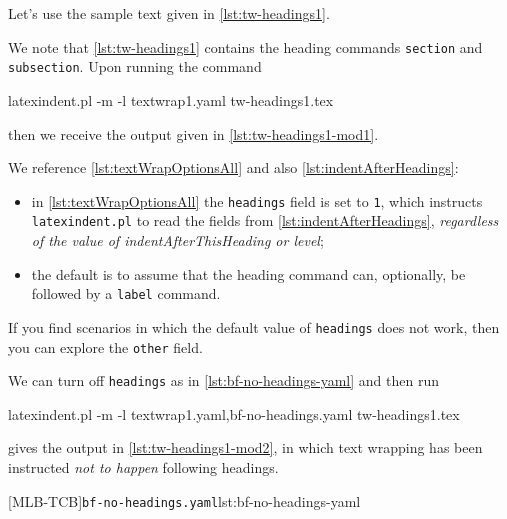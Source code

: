 \documentclass[10pt]{article}
\begin{document}
 \begin{example}
 Let's use the sample text given in \cref{lst:tw-headings1}. 


 We note that \cref{lst:tw-headings1} contains the heading commands \texttt{section} and
 \texttt{subsection}. Upon running the command

 \begin{commandshell}
latexindent.pl -m -l textwrap1.yaml tw-headings1.tex
\end{commandshell}

 then we receive the output given in \cref{lst:tw-headings1-mod1}.


 We reference \vref{lst:textWrapOptionsAll} and also \vref{lst:indentAfterHeadings}:
 \begin{itemize}
  \item in \cref{lst:textWrapOptionsAll} the \texttt{headings} field is set to
        \texttt{1}, which instructs \texttt{latexindent.pl} to read the fields from
        \vref{lst:indentAfterHeadings}, \emph{regardless of the value of
        indentAfterThisHeading or level};
  \item the default is to assume that the heading command can, optionally, be followed by
        a \texttt{label} command.
 \end{itemize}
 If you find scenarios in which the default value of \texttt{headings} does not work,
 then you can explore the \texttt{other} field.

 We can turn off \texttt{headings} as in \cref{lst:bf-no-headings-yaml} and then run

 \begin{commandshell}
latexindent.pl -m -l textwrap1.yaml,bf-no-headings.yaml tw-headings1.tex
\end{commandshell}

 gives the output in \cref{lst:tw-headings1-mod2}, in which text wrapping has been
 instructed \emph{not to happen} following headings.
 \begin{cmhtcbraster}
  [MLB-TCB]{\texttt{bf-no-headings.yaml}}{lst:bf-no-headings-yaml}
 \end{cmhtcbraster}
 \end{example}
\end{document}
